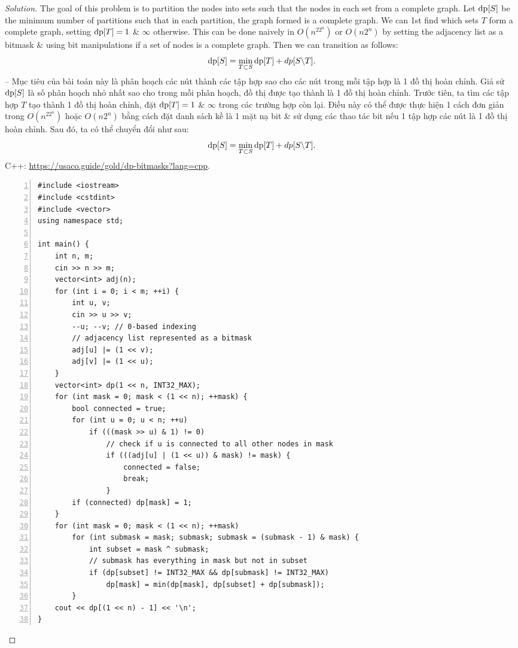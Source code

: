\documentclass{article}
\begin{document}
\begin{proof}[Solution]
    The goal of this problem is to partition the nodes into sets such that the nodes in each set from a complete graph. Let ${\rm dp}[S]$ be the minimum number of partitions such that in each partition, the graph formed is a complete graph. We can 1st find which sets $T$ form a complete graph, setting ${\rm dp}[T]= 1$ \& $\infty$ otherwise. This can be done naively in $O(n^22^n)$ or $O(n2^n)$ by setting the adjacency list as a bitmask \& using bit manipulations if a set of nodes is a complete graph. Then we can transition as follows:
    \begin{equation*}
        {\rm dp}[S] = \min_{T\subset S} {\rm dp}[T] + dp[S\backslash T].
    \end{equation*}
    -- Mục tiêu của bài toán này là phân hoạch các nút thành các tập hợp sao cho các nút trong mỗi tập hợp là 1 đồ thị hoàn chỉnh. Giả sử ${\rm dp}[S]$ là số phân hoạch nhỏ nhất sao cho trong mỗi phân hoạch, đồ thị được tạo thành là 1 đồ thị hoàn chỉnh. Trước tiên, ta tìm các tập hợp $T$ tạo thành 1 đồ thị hoàn chỉnh, đặt ${\rm dp}[T]= 1$ \& $\infty$ trong các trường hợp còn lại. Điều này có thể được thực hiện 1 cách đơn giản trong $O(n^22^n)$ hoặc $O(n2^n)$ bằng cách đặt danh sách kề là 1 mặt nạ bit \& sử dụng các thao tác bit nếu 1 tập hợp các nút là 1 đồ thị hoàn chỉnh. Sau đó, ta có thể chuyển đổi như sau:
    \begin{equation*}
        {\rm dp}[S] = \min_{T\subset S} {\rm dp}[T] + dp[S\backslash T].
    \end{equation*}
    C++: \url{https://usaco.guide/gold/dp-bitmasks?lang=cpp}.
    \begin{Verbatim}[numbers=left,xleftmargin=5mm]
#include <iostream>
#include <cstdint>
#include <vector>
using namespace std;

int main() {
    int n, m;
    cin >> n >> m;
    vector<int> adj(n);
    for (int i = 0; i < m; ++i) {
        int u, v;
        cin >> u >> v;
        --u; --v; // 0-based indexing
        // adjacency list represented as a bitmask
        adj[u] |= (1 << v);
        adj[v] |= (1 << u);
    }
    vector<int> dp(1 << n, INT32_MAX);
    for (int mask = 0; mask < (1 << n); ++mask) {
        bool connected = true;
        for (int u = 0; u < n; ++u)
            if (((mask >> u) & 1) != 0)
                // check if u is connected to all other nodes in mask
                if (((adj[u] | (1 << u)) & mask) != mask) {
                    connected = false;
                    break;
                }
        if (connected) dp[mask] = 1;
    }
    for (int mask = 0; mask < (1 << n); ++mask)
        for (int submask = mask; submask; submask = (submask - 1) & mask) {
            int subset = mask ^ submask;
            // submask has everything in mask but not in subset
            if (dp[subset] != INT32_MAX && dp[submask] != INT32_MAX)
                dp[mask] = min(dp[mask], dp[subset] + dp[submask]);
        }
    cout << dp[(1 << n) - 1] << '\n';
}
    \end{Verbatim}
\end{proof}
\end{document}
